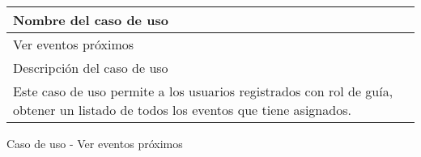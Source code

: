 \begin{identificacionCasoDeUso}
	\begin{tabular} { | p{17cm} |}

		\hline
		Nombre del caso de uso                                                                                                            \\ \hline
		Ver eventos próximos                                                                                                              \\ \hline
		Descripción del caso de uso                                                                                                       \\ \hline
		Este caso de uso permite a los usuarios registrados con rol de guía, obtener un listado de todos los eventos que tiene asignados. \\ \hline
	\end{tabular}
	\caption{Caso de uso - Ver eventos próximos}
\end{identificacionCasoDeUso}